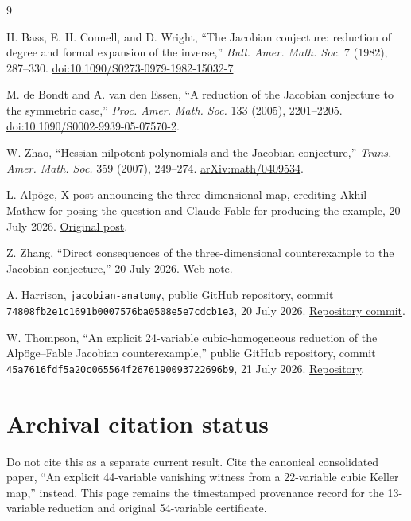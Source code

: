 \documentclass[11pt]{article}
\begin{document}
\begin{thebibliography}{9}

H. Bass, E. H. Connell, and D. Wright,
``The Jacobian conjecture: reduction of degree and formal expansion of the inverse,''
\emph{Bull. Amer. Math. Soc.} 7 (1982), 287--330.
\href{https://doi.org/10.1090/S0273-0979-1982-15032-7}{doi:10.1090/S0273-0979-1982-15032-7}.

M. de Bondt and A. van den Essen,
``A reduction of the Jacobian conjecture to the symmetric case,''
\emph{Proc. Amer. Math. Soc.} 133 (2005), 2201--2205.
\href{https://doi.org/10.1090/S0002-9939-05-07570-2}{doi:10.1090/S0002-9939-05-07570-2}.

W. Zhao,
``Hessian nilpotent polynomials and the Jacobian conjecture,''
\emph{Trans. Amer. Math. Soc.} 359 (2007), 249--274.
\href{https://arxiv.org/abs/math/0409534}{arXiv:math/0409534}.

L. Alpöge,
X post announcing the three-dimensional map, crediting Akhil Mathew for posing
the question and Claude Fable for producing the example, 20 July 2026.
\href{https://x.com/__alpoge__/status/2079028340955197566}{Original post}.

Z. Zhang,
``Direct consequences of the three-dimensional counterexample to the Jacobian
conjecture,'' 20 July 2026.
\href{https://zzhang-iu.github.io/papers/direct-consequences-jacobian/}{Web note}.

A. Harrison,
\texttt{jacobian-anatomy}, public GitHub repository, commit
\nolinkurl{74808fb2e1c1691b0007576ba0508e5e7cdcb1e3}, 20 July 2026.
\href{https://github.com/DrAlexHarrison/jacobian-anatomy/commit/74808fb2e1c1691b0007576ba0508e5e7cdcb1e3}{Repository commit}.

W. Thompson,
``An explicit 24-variable cubic-homogeneous reduction of the Alp\"oge--Fable
Jacobian counterexample,'' public GitHub repository, commit
\nolinkurl{45a7616fdf5a20c065564f2676190093722696b9}, 21 July 2026.
\href{https://github.com/wtho704/explicit-cubic-homogeneous-jacobian-counterexample}{Repository}.

\end{thebibliography}

\section*{Archival citation status}

\noindent Do not cite this as a separate current result. Cite the canonical
consolidated paper, ``An explicit 44-variable vanishing witness from a
22-variable cubic Keller map,'' instead. This page remains the timestamped
provenance record for the 13-variable reduction and original 54-variable
certificate.
\end{document}
